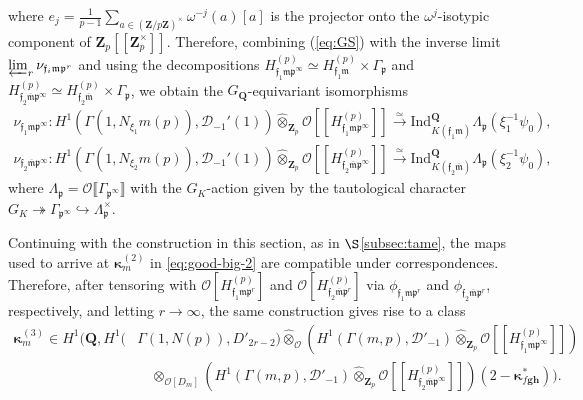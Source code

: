 \documentclass[10pt,letterpaper]{amsart}
\theoremstyle{plain}
\theoremstyle{definition}
\theoremstyle{definition}
\theoremstyle{plain}
\theoremstyle{plain}
\theoremstyle{plain}
\theoremstyle{remark}
\numberwithin{equation}{section}
\newcommand{\ch}{\xi}
\newcommand{\pp}{\mathfrak{p}}
\newcommand{\fkm}{\mathfrak{m}}
\newcommand{\fkmbar}{\overline{\mathfrak{m}}}
\newcommand{\fkf}{\mathfrak{f}}
\newcommand{\bZ}{\mathbf{Z}}
\def\cO{\mathcal O}
\newcommand{\Q}{\mathbf{Q}}
\newcommand{\Z}{\mathbf{Z}}
\newcommand{\dBr}[1]{\llbracket{#1}\rrbracket}
\newcommand{\bfg}{{\boldsymbol{g}}}
\newcommand{\bfh}{{\boldsymbol{h}}}
\begin{document}
where $e_j=\frac{1}{p-1}\sum_{a\in(\Z/p\Z)^\times}\omega^{-j}(a)[a]$ %
is the projector onto the $\omega^j$-isotypic component of $\bZ_p[\![\Z_p^\times]\!]$. 
Therefore, combining (\ref{eq:GS}) with the inverse limit $\varprojlim_r\nu_{\fkf_i\fkm\pp^r}$ and using the decompositions $H_{\fkf_1\fkm\pp^\infty}^{(p)}\simeq H_{\fkf_1\fkm}^{(p)}\times\Gamma_\pp$ and $H_{\fkf_2\fkmbar\pp^\infty}^{(p)}\simeq H_{\fkf_2\fkmbar}^{(p)}\times\Gamma_\pp$, we obtain the $G_\Q$-equivariant isomorphisms
\begin{equation}\label{eq:nu-infty}
\begin{aligned}
\nu_{\fkf_1\fkm\pp^\infty}:H^1(\Gamma(1,N_{\xi_1}m(p)),\mathcal{D}_{-1}'(1))\hat\otimes_{\Z_p}\cO[\![H_{\fkf_1\fkm\pp^\infty}^{(p)}]\!]\xrightarrow{\simeq}{\mathrm{Ind}}_{K(\fkf_1\fkm)}^\Q\Lambda_\pp(\ch_1^{-1}\psi_0),\\
\nu_{\fkf_2\fkmbar\pp^\infty}:H^1(\Gamma(1,N_{\xi_2}m(p)),\mathcal{D}_{-1}'(1))\hat\otimes_{\Z_p}\cO[\![H_{\fkf_2\fkmbar\pp^\infty}^{(p)}]\!]\xrightarrow{\simeq}{\mathrm{Ind}}_{K(\fkf_2\fkmbar)}^\Q\Lambda_\pp(\ch_2^{-1}\psi_0),
\end{aligned}
\end{equation}
where $\Lambda_\pp=\cO\dBr{\Gamma_{\pp^\infty}}$ with the $G_K$-action given by the tautological character $G_K\twoheadrightarrow\Gamma_{\pp^\infty}\hookrightarrow\Lambda_\pp^\times$.

Continuing with the construction in this section, as in $\S$\ref{subsec:tame}, the maps used to arrive at   $\boldsymbol{\kappa}_m^{(2)}$ in \eqref{eq:good-big-2} are compatible under correspondences. Therefore, after tensoring with $\cO[H_{\fkf_1\fkm\pp^r}^{(p)}]$ and $\cO[H_{\fkf_2\fkmbar\pp^r}^{(p)}]$ via $\phi_{\fkf_1\fkm\pp^r}$ and $\phi_{\fkf_2\fkmbar\pp^r}$, respectively, and letting $r\rightarrow\infty$, the same construction gives rise  to a class
\begin{align*}\label{eq:good-big-3}
\boldsymbol{\kappa}_{m}^{(3)}\in H^1\bigl(\Q,H^1(&\Gamma(1,N(p)),D'_{2r-2})\hat\otimes_{\cO} (H^1(\Gamma(m,p),\mathcal{D}'_{-1})\hat\otimes_{\Z_p}\cO[\![H_{\fkf_1\fkm\pp^\infty}^{(p)}]\!])\\
&\quad\hat\otimes_{\cO[D_m]} (H^1(\Gamma(m,p),\mathcal{D}'_{-1})\hat\otimes_{\Z_p}\cO[\![H_{\fkf_2\fkmbar\pp^\infty}^{(p)}]\!])(2-\boldsymbol{\kappa}_{f\bfg\bfh}^*)\bigr).
\end{align*}
\end{document}
